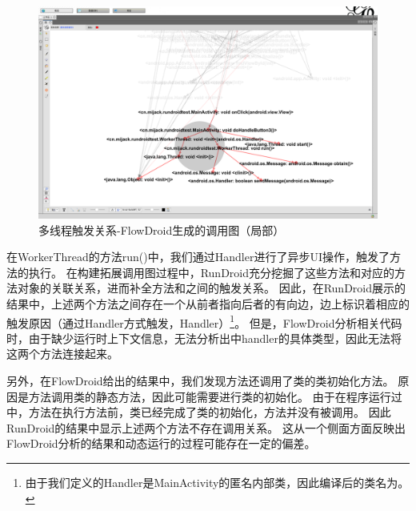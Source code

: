 \begin{figure}[ht]
	\centering
	\includegraphics[width=\textwidth]{./Figures/FlowDroid-handler.png}
	\caption{多线程触发关系-FlowDroid生成的调用图（局部）}
	\label{fig:flowdroid-result-handler}
\end{figure}


在WorkerThread的方法run()中，我们通过Handler进行了异步UI操作，触发了方法的执行。
在构建拓展调用图过程中，RunDroid充分挖掘了这些方法和对应的方法对象的关联关系，进而补全方法和之间的触发关系。
因此，在RunDroid展示的结果中，上述两个方法之间存在一个从前者指向后者的有向边，边上标识着相应的触发原因（通过Handler方式触发，Handler）\footnote{由于我们定义的Handler是MainActivity的匿名内部类，因此编译后的类名为。}。
但是，FlowDroid分析相关代码时，由于缺少运行时上下文信息，无法分析出中handler的具体类型，因此无法将这两个方法连接起来。






另外，在FlowDroid给出的结果中，我们发现方法还调用了类的类初始化方法。
原因是方法调用类的静态方法，因此可能需要进行类的初始化。
由于在程序运行过中，方法在执行方法前，类已经完成了类的初始化，方法并没有被调用。
因此RunDroid的结果中显示上述两个方法不存在调用关系。
这从一个侧面方面反映出FlowDroid分析的结果和动态运行的过程可能存在一定的偏差。





